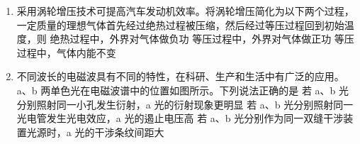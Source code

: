 \documentclass[\gkver]{gaokaozhenti}
\begin{document}
\begin{enumerate}
{故 A 正确；

B．因 a 和 b 两列波的波速相同，由 a 和 b 两列波分别传播到 $x = 3 \Um$ 和 $x = 5 \Um$ 处的时刻相同，可知 O 与 P 开始振动的时刻不相同，故 B 错误；

C．因 a 与 b 的频率不同，a 与 b 相遇后不能产生干涉现象，故 C 错误；

D．a 波刚传到 $3 \Um$ 处，由波形平移法可知，$3 \Um$ 处的质点开始振动方向沿 $y$ 轴负方向，而所有质点的开始振动方向都相同，所以 O 点开始振动的方向也沿 $y$ 轴负方向，故 D 错误。

故选 A。
}

\item
采用涡轮增压技术可提高汽车发动机效率。将涡轮增压简化为以下两个过程，一定质量的理想气体首先经过绝热过程被压缩，然后经过等压过程回到初始温度，则
{绝热过程中，外界对气体做负功}
{等压过程中，外界对气体做正功}
{等压过程中，气体内能不变}

\item
不同波长的电磁波具有不同的特性，在科研、生产和生活中有广泛的应用。a、b 两单色光在电磁波谱中的位置如图所示。下列说法正确的是
{若 a、b 光分别照射同一小孔发生衍射，a 光的衍射现象更明显}
{若 a、b 光分别照射同一光电管发生光电效应，a 光的遏止电压高}
{若 a、b 光分别作为同一双缝干涉装置光源时，a 光的干涉条纹间距大}
\end{enumerate}
\end{document}
